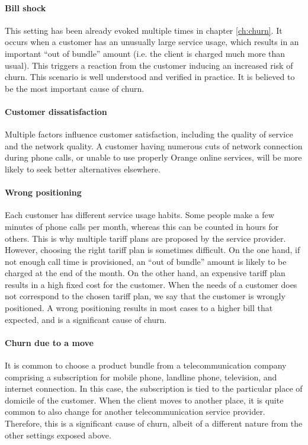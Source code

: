 \paragraph{Bill shock} This setting has been already evoked multiple times in
chapter \ref{ch:churn}. It occurs when a customer has an unusually large
service usage, which results in an important ``out of bundle'' amount (i.e. the
client is charged much more than usual). This triggers a reaction from the
customer inducing an increased risk of churn. This scenario is well understood
and verified in practice. It is believed to be the most important cause of
churn.

\paragraph{Customer dissatisfaction} Multiple factors influence customer
satisfaction, including the quality of service and the network quality. A
customer having numerous cuts of network connection during phone calls, or
unable to use properly Orange online services, will be more likely to seek
better alternatives elsewhere.

\paragraph{Wrong positioning} Each customer has different service usage habits.
Some people make a few minutes of phone calls per month, whereas this can be
counted in hours for others. This is why multiple tariff plans are proposed by
the service provider. However, choosing the right tariff plan is sometimes
difficult. On the one hand, if not enough call time is provisioned, an ``out of
bundle'' amount is likely to be charged at the end of the month. On the other
hand, an expensive tariff plan results in a high fixed cost for the customer.
When the needs of a customer does not correspond to the chosen tariff plan, we
say that the customer is wrongly positioned. A wrong positioning results in most
cases to a higher bill that expected, and is a significant cause of churn.

\paragraph{Churn due to a move} It is common to choose a product bundle from a
telecommunication company comprising a subscription for mobile phone, landline
phone, television, and internet connection. In this case, the subscription is
tied to the particular place of domicile of the customer. When the client moves
to another place, it is quite common to also change for another
telecommunication service provider. Therefore, this is a significant cause of
churn, albeit of a different nature from the other settings exposed above.


